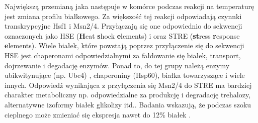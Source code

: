 \documentclass{pracamgr}
\begin{document}
  Największą przemianą jaka następuje w komórce podczas reakcji na temperaturę jest zmiana profilu białkowego. Za większość tej 
 reakcji odpowiadają czynnki transkrypcyjne Hsf1 i Msn2/4. Przyłączają się one odpowiednio do sekwencji oznaczonych jako 
 HSE (\textbf{H}eat \textbf{s}hock \textbf{e}lements) i oraz STRE (\textbf{st}ress \textbf{r}esponse \textbf{e}lements).
 Wiele białek, które powstają poprzez przyłączenie się do sekwencji HSE
 jest chaperonami odpowiedzialnymi za fałdowanie się białek, transport, dojrzewanie i degadację enzymów. Ponad to, do tej grupy
 należą enzymy ubikwitynujące (np. Ubc4) , chaperoniny (Hsp60), białka towarzyszące i wiele innych. Odpowiedź wynikająca z 
 przyłączenia się Msn2/4 do STRE ma bardziej charakter metaboliczny np. odpowiedzialne za produkcję i degradację trehalozy, 
 alternatywne izoformy białek glikolizy itd.\cite{MsnContraHsf1}. Badania wskazują, że podczas szoku cieplnego może zmieniać się
 ekspresja nawet do 12\% białek \cite{TransciptomeUponHeatShock}.
\end{document}
